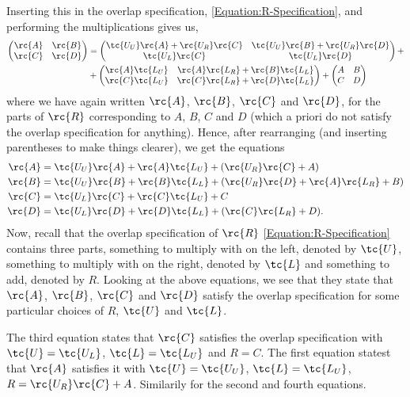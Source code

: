 Inserting this in the overlap specification, \eqref{Equation:R-Specification}, and performing the multiplications gives us,
\begin{align*}
  \begin{pmatrix}
    \rc{A} & \rc{B} \\
    \rc{C} & \rc{D}
  \end{pmatrix} &= 
  \begin{pmatrix}
    \tc{U_U}\rc{A} + \rc{U_R}\rc{C}  &  \tc{U_U}\rc{B} + \rc{U_R}\rc{D} \\
    \tc{U_L}\rc{C}                   &  \tc{U_L}\rc{D}
  \end{pmatrix}
  +\\&+
  \begin{pmatrix}
    \rc{A}\tc{L_U}        &   \rc{A}\rc{L_R} + \rc{B}\tc{L_L}\\
    \rc{C}\tc{L_U}        &   \rc{C}\rc{L_R} + \rc{D}\tc{L_L}
  \end{pmatrix}
  +
  \begin{pmatrix}
    A & B \\
    C & D
  \end{pmatrix}
\end{align*}
where we have again written $\rc{A}$, $\rc{B}$, $\rc{C}$ and $\rc{D}$, for the parts of $\rc{R}$ corresponding to $A$, $B$, $C$ and $D$ (which a priori do not satisfy the overlap specification for anything).
Hence, after rearranging (and inserting parentheses to make things clearer), we get the equations
\begin{align*}
  \rc{A} &= \tc{U_U}\rc{A} + \rc{A}\tc{L_U} + (\rc{U_R}\rc{C} + A) \\
  \rc{B} &= \tc{U_U}\rc{B} + \rc{B}\tc{L_L} + (\rc{U_R}\rc{D} + \rc{A}\rc{L_R} + B) \\
  \rc{C} &= \tc{U_L}\rc{C} + \rc{C}\tc{L_U} + C\\
  \rc{D} &= \tc{U_L}\rc{D} + \rc{D}\tc{L_L} + (\rc{C}\rc{L_R} +  D).
\end{align*}
Now, recall that the overlap specification of $\rc{R}$ \eqref{Equation:R-Specification} contains three parts, something to multiply with on the left, denoted by $\tc{U}$, something to multiply with on the right, denoted by $\tc{L}$ and something to add, denoted by $R$. Looking at the above equations, we see that they state that $\rc{A}$, $\rc{B}$, $\rc{C}$ and $\rc{D}$ satisfy the  overlap specification for some particular choices of $R$, $\tc{U}$ and $\tc{L}$.

The third equation states that  $\rc{C}$ satisfies the overlap specification with $\tc{U} = \tc{U_L}$, $\tc{L} = \tc{L_U}$ and $R = C$. The first equation
statest that $\rc{A}$ satisfies it with $\tc{U} = \tc{U_U}$, $\tc{L} = \tc{L_U}$, $R = \rc{U_R}\rc{C} + A$. Similarily for the second and fourth equations.

